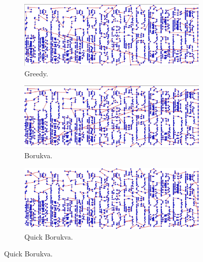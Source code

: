 \documentclass[13pt,a4paper]{article}
\begin{document}
\begin{figure}[b]
    \centering 
    \begin{subfigure}[t]{0.3\textwidth}
      \centering
      \includegraphics[width=\textwidth]{img/3/G.png}
      \caption{Greedy.}
    \end{subfigure}
    \begin{subfigure}[t]{0.3\textwidth}
        \centering
        \includegraphics[width=\textwidth]{img/3/B.png}
        \caption{Borukva.}
    \end{subfigure}
    \begin{subfigure}[t]{0.3\textwidth}
      \centering
      \includegraphics[width=\textwidth]{img/3/Q.png}
      \caption{Quick Borukva.}
    \end{subfigure}


\end{figure}
\end{document}
